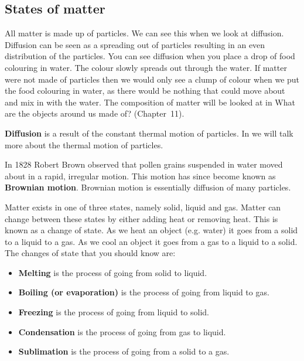             \subsection{ States of matter}
            \nopagebreak
\label{m38736*id324876121}All matter is made up of particles. We can see this when we look at diffusion.
Diffusion can be seen as a spreading out of particles resulting in an even distribution of the particles. You can see diffusion when you place a drop of food colouring in water. The colour slowly spreads out through the water. If matter were not made of particles then we would only see a clump of colour when we put the food colouring in water, as there would be nothing that could move about and mix in with the water. The composition of matter will be looked at in What are the objects around us made of? (Chapter~11). 
\par 
\label{m38736*id10987324}\textbf{Diffusion} is a result of the constant thermal motion of particles. In  we will talk more about the thermal motion of particles. 
\par 
\label{m38736*id0128031}In 1828 Robert Brown observed that pollen grains suspended in water moved about in a rapid, irregular motion. This motion has since become known as \textbf{Brownian motion}. Brownian motion is essentially diffusion of many particles.
\par 
\label{m38736*id48327}Matter exists in one of three states, namely solid, liquid and gas. Matter can change between these states by either adding heat or removing heat. This is known as a change of state. As we heat an object (e.g. water) it goes from a solid to a liquid to a gas. As we cool an object it goes from a gas to a liquid to a solid.
The changes of state that you should know are:
\label{m38736*id02341}\begin{itemize}[noitemsep]
\item \textbf{Melting} is the process of going from solid to liquid.
\item \textbf{Boiling (or evaporation)} is the process of going from liquid to gas.
\item \textbf{Freezing} is the process of going from liquid to solid.
\item \textbf{Condensation} is the process of going from gas to liquid.
\item \textbf{Sublimation} is the process of going from a solid to a gas. \end{itemize}
